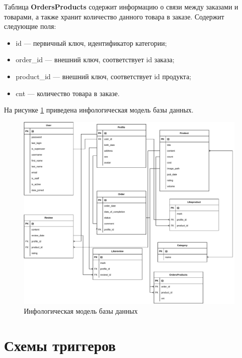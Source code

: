 Таблица \textbf{OrdersProducts} содержит информацию о связи между заказами и товарами, а также хранит количество данного товара в заказе. Содержит следующие поля:

\begin{itemize}
	\item id --- первичный ключ, идентификатор категории;
	\item order\_id --- внешний ключ, соответствует id заказа;
	\item product\_id --- внешний ключ, соответствует id продукта;
	\item cnt --- количество товара в заказе.
\end{itemize}

\newpage

На рисунке \ref{er_db} приведена инфологическая модель базы данных.

\captionsetup{singlelinecheck = false, justification=centering}
\begin{figure}[h!]
	\begin{center}
		\includegraphics[scale=0.6]{assets/er_db.pdf}
	\end{center}
	\caption{Инфологическая модель базы данных}
	\label{er_db}
\end{figure}

\section{Схемы триггеров}

